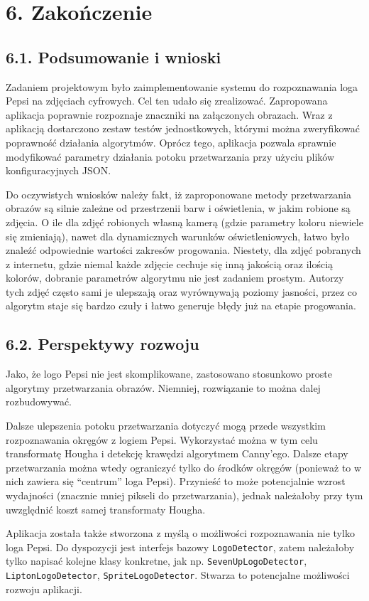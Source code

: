 \documentclass[11pt,a4paper,twoside]{report}
\begin{document}
\section*{6. Zakończenie}

	\subsection*{6.1. Podsumowanie i wnioski}

		Zadaniem projektowym było zaimplementowanie systemu do rozpoznawania loga Pepsi na zdjęciach cyfrowych. Cel ten udało się zrealizować. Zapropowana aplikacja poprawnie rozpoznaje znaczniki na załączonych obrazach. Wraz z aplikacją dostarczono zestaw testów jednostkowych, którymi można zweryfikować poprawność działania algorytmów. Oprócz tego, aplikacja pozwala sprawnie modyfikować parametry działania potoku przetwarzania przy użyciu plików konfiguracyjnych JSON.

		Do oczywistych wniosków należy fakt, iż zaproponowane metody przetwarzania obrazów są silnie zależne od przestrzenii barw i oświetlenia, w jakim robione są zdjęcia. O ile dla zdjęć robionych własną kamerą (gdzie parametry koloru niewiele się zmieniają), nawet dla dynamicznych warunków oświetleniowych, łatwo było znaleźć odpowiednie wartości zakresów progowania. Niestety, dla zdjęć pobranych z internetu, gdzie niemal każde zdjęcie cechuje się inną jakością oraz ilością kolorów, dobranie parametrów algorytmu nie jest zadaniem prostym. Autorzy tych zdjęć często sami je ulepszają oraz wyrównywają poziomy jasności, przez co algorytm staje się bardzo czuły i łatwo generuje błędy już na etapie progowania.

	\subsection*{6.2. Perspektywy rozwoju}

		Jako, że logo Pepsi nie jest skomplikowane, zastosowano stosunkowo proste algorytmy przetwarzania obrazów. Niemniej, rozwiązanie to można dalej rozbudowywać.

		Dalsze ulepszenia potoku przetwarzania dotyczyć mogą przede wszystkim rozpoznawania okręgów z logiem Pepsi. Wykorzystać można w tym celu transformatę Hougha i detekcję krawędzi algorytmem Canny'ego. Dalsze etapy przetwarzania można wtedy ograniczyć tylko do środków okręgów (ponieważ to w nich zawiera się ``centrum'' loga Pepsi). Przynieść to może potencjalnie wzrost wydajności (znacznie mniej pikseli do przetwarzania), jednak należałoby przy tym uwzględnić koszt samej transformaty Hougha.

		Aplikacja została także stworzona z myślą o możliwości rozpoznawania nie tylko loga Pepsi. Do dyspozycji jest interfejs bazowy \texttt{LogoDetector}, zatem należałoby tylko napisać kolejne klasy konkretne, jak np. \texttt{SevenUpLogoDetector}, \texttt{LiptonLogoDetector}, \texttt{SpriteLogoDetector}. Stwarza to potencjalne możliwości rozwoju aplikacji.
\end{document}
